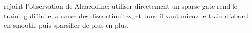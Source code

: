 rejoint l'observation de Alaaeddine: utiliser directement un sparse gate rend le training
difficile, a cause des discontinuites, et donc il vaut mieux le train d'abord en smooth, puis
sparsifier de plus en plus.
